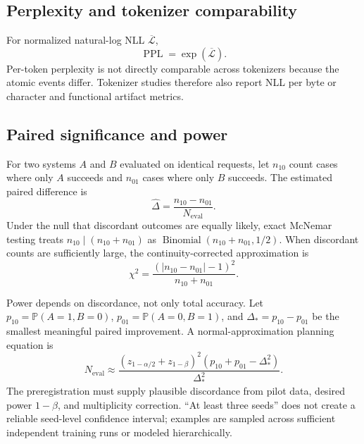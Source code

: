 \documentclass[10pt,letterpaper]{article}
\newcommand{\Prob}{\mathbb{P}}
\newcommand{\1}{\mathbb{1}}
\begin{document}
\subsection{Perplexity and tokenizer comparability}

For normalized natural-log NLL $\overline{\mathcal L}$,
\begin{equation}
  \operatorname{PPL}=\exp(\overline{\mathcal L}).
  \label{eq:perplexity}
\end{equation}
Per-token perplexity is not directly comparable across tokenizers because the atomic events differ.
Tokenizer studies therefore also report NLL per byte or character and functional artifact metrics.

\subsection{Paired significance and power}

For two systems $A$ and $B$ evaluated on identical requests, let $n_{10}$ count cases where only
$A$ succeeds and $n_{01}$ cases where only $B$ succeeds.  The estimated paired difference is
\begin{equation}
  \widehat\Delta=\frac{n_{10}-n_{01}}{N_{\mathrm{eval}}}.
  \label{eq:paired-delta}
\end{equation}
Under the null that discordant outcomes are equally likely, exact McNemar testing treats
$n_{10}\mid(n_{10}+n_{01})$ as $\operatorname{Binomial}(n_{10}+n_{01},1/2)$.  When discordant counts
are sufficiently large, the continuity-corrected approximation is
\begin{equation}
  \chi^2=\frac{(|n_{10}-n_{01}|-1)^2}{n_{10}+n_{01}}.
  \label{eq:mcnemar}
\end{equation}

Power depends on discordance, not only total accuracy.  Let
$p_{10}=\Prob(A=1,B=0)$, $p_{01}=\Prob(A=0,B=1)$, and
$\Delta_*=p_{10}-p_{01}$ be the smallest meaningful paired improvement.  A normal-approximation
planning equation is
\begin{equation}
  N_{\mathrm{eval}}
  \approx
  \frac{(z_{1-\alpha/2}+z_{1-\beta})^2
  \left(p_{10}+p_{01}-\Delta_*^2\right)}{\Delta_*^2}.
  \label{eq:paired-power}
\end{equation}
The preregistration must supply plausible discordance from pilot data, desired power $1-\beta$, and
multiplicity correction.  ``At least three seeds'' does not create a reliable seed-level confidence
interval; examples are sampled across sufficient independent training runs or modeled hierarchically.
\end{document}
